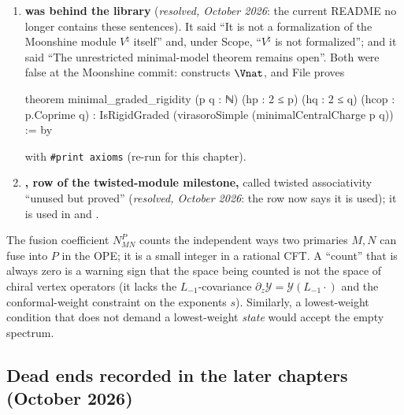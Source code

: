 \begin{enumerate}
  umbrella'' or ``not wired into the umbrella'' (for example  and the
  header of ); a search of both files on 28~October~2026 finds no such header. Route notes contain superseded estimates and ``open'' claims, corrected in later
  ``Update''/``Status'' sections.
\item \textbf{ was behind the library} (\emph{resolved, October 2026}: the current README no longer
  contains these sentences). It said ``It is not a formalization of the
  Moonshine module $V^\natural$ itself'' and, under Scope, ``$V^\natural$ is not formalized''; and it said
  ``The unrestricted minimal-model theorem remains open''. Both were false at the Moonshine commit:
   constructs $\Vnat$, and File
   proves
\begin{leancode}
theorem minimal_graded_rigidity (p q : ℕ) (hp : 2 ≤ p) (hq : 2 ≤ q)
    (hcop : p.Coprime q) :
    IsRigidGraded (virasoroSimple (minimalCentralCharge p q)) := by
\end{leancode}
  with \texttt{\#print axioms}  (re-run for this
  chapter).
\item \textbf{, row of the twisted-module milestone,} called twisted associativity
   ``unused but proved'' (\emph{resolved, October 2026}: the row now says it is used); it is used in
   and .
\end{enumerate}

\begin{physics}
The fusion coefficient $N^P_{MN}$ counts the independent ways two primaries $M,N$ can fuse into $P$
in the OPE; it is a small integer in a rational CFT. A ``count'' that is always zero is a warning
sign that the space being counted is not the space of chiral vertex operators (it lacks the
$L_{-1}$-covariance $\partial_z\mathcal Y=\mathcal Y(L_{-1}\cdot)$ and the conformal-weight constraint on
the exponents $s$). Similarly, a lowest-weight condition that does not demand a lowest-weight
\emph{state} would accept the empty spectrum.
\end{physics}

\subsection{Dead ends recorded in the later chapters (October 2026)}\label{ch15:sec:deadends-oct}

